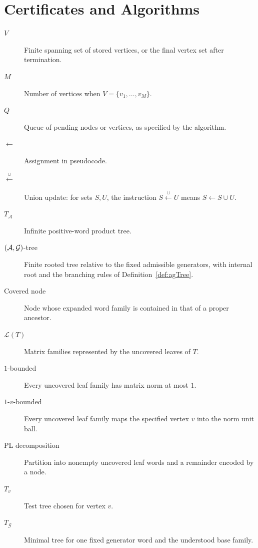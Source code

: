 \section{Certificates and Algorithms}
\begin{description}
    \item[$V$] Finite spanning set of stored vertices, or the final vertex set after termination.
    \item[$M$] Number of vertices when $V=\{v_1,\dots,v_M\}$.
    \item[$Q$] Queue of pending nodes or vertices, as specified by the algorithm.
    \item[$\gets$] Assignment in pseudocode.
    \item[$\xleftarrow{\cup}$] Union update: for sets $S,U$, the instruction $S\xleftarrow{\cup}U$ means $S\gets S\cup U$.
    \item[$T_{\mathcal{A}}$] Infinite positive-word product tree.
    \item[$(\mathcal{A},\mathcal{G})$-tree] Finite rooted tree relative to the fixed admissible generators, with internal root and the branching rules of Definition~\ref{def:agTree}.
    \item[Covered node] Node whose expanded word family is contained in that of a proper ancestor.
    \item[$\mathcal{L}(T)$] Matrix families represented by the uncovered leaves of $T$.
    \item[$1$-bounded] Every uncovered leaf family has matrix norm at most $1$.
    \item[$1$-$v$-bounded] Every uncovered leaf family maps the specified vertex $v$ into the norm unit ball.
    \item[PL decomposition] Partition into nonempty uncovered leaf words and a remainder encoded by a node.
    \item[$T_v$] Test tree chosen for vertex $v$.
    \item[$T_{\mathcal{G}}$] Minimal tree for one fixed generator word and the understood base family.
\end{description}
